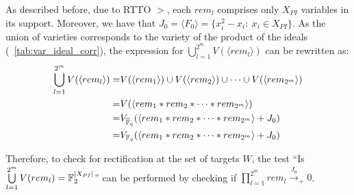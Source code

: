 As described before, due to RTTO $>$, each $rem_l$ comprises 
only $X_{PI}$ variables in its support. Moreover, we have that 
$J_0 = \langle F_0 \rangle = \{x_i^2-x_i:~x_i \in X_{PI}\}$. 
As the union of varieties corresponds to the variety of the 
product of the ideals (~\autoref{tab:var_ideal_corr}), the expression
for $\bigcup\limits_{l=1}^{2^m}V(\langle rem_l\rangle)$ can be rewritten as:
\begin{align*}
 \bigcup\limits_{l=1}^{2^m}V(\langle rem_l\rangle) =& V(\langle rem_1 \rangle) \cup V( \langle rem_2 \rangle) \cup \dots \cup V(\langle rem_{2^m} \rangle)\\
  =&V(\langle rem_1 * rem_2 *  \dots * rem_{2^m} \rangle) \\
  =&V_{\overline{\mathbb{F}}_q}(\langle rem_1 * rem_2 * \dots * rem_{2^m} \rangle+ J_0) \\
  =&V_{{\mathbb{F}}_{q}}(\langle rem_1 * rem_2 * \dots * rem_{2^m} \rangle+ J_0)
\end{align*}

Therefore, to check for rectification at the set of targets $W$, 
the test ``Is $\bigcup\limits_{l=1}^{2^m}V(rem_l) =
  {\mathbb{F}}_2^{|X_{PI}|}$'' can be performed by checking if
$\prod_{l=1}^{2^m} rem_l\xrightarrow{J_0}_+0$.



